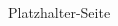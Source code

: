 \documentclass{book}
\begin{document}

\chapterPage{\bmhExpertToc}{\bmhExpertChapter}

\twoPageHeader[lRulesExpert]{\bmhExpertHeadline}
\begin{multicols}{2}
	\bmhExpert
\end{multicols}\newpage

\onePageHeader[lHeroCleric]{\bmhHeroesClericHeadline}
\begin{multicols*}{2}
	\bmhHeroesCleric
\end{multicols*}\newpage

\onePageHeader[lHeroFigher]{\bmhHeroesFighterHeadline}
\begin{multicols*}{2}
	\bmhHeroesFighter
\end{multicols*}\newpage

\onePageHeader[lHeroWizard]{\bmhHeroesWizardHeadline}
\begin{multicols*}{2}
	\bmhHeroesWizard
\end{multicols*}\newpage

\onePageHeader[lHeroThief]{\bmhHeroesThiefHeadline}
\begin{multicols*}{2}
	\bmhHeroesThief
\end{multicols*}\newpage

\onePageHeader[lHeroRanger]{\bmhHeroesRangerHeadline}
\begin{multicols*}{2}
	\bmhHeroesRanger
\end{multicols*}\newpage

\onePageHeader[lNone]{  }
Platzhalter-Seite \newpage


\chapterPage{\bmhMiscMissionsToc}{\bmhMiscMissions}

\backgroundpagesmissions





\backgroundpages
{}
\twoPageHeader[lBestiary]{\bmhBestiaryHeadline}
\begin{multicols*}{2}
	\bmhBestiary
\end{multicols*}\newpage
\end{document}
